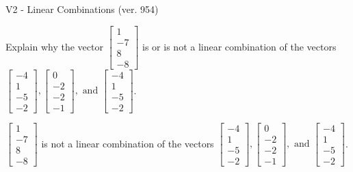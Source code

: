\begin{exercise}
  \begin{exerciseTitle}V2 - Linear Combinations (ver. 954)\end{exerciseTitle}
  \begin{exerciseStatement}
    Explain why the vector \(\left[\begin{array}{c}
1 \\
-7 \\
8 \\
-8
\end{array}\right]\)  is or is not a linear 
	combination of the vectors \(\left[\begin{array}{c}
-4 \\
1 \\
-5 \\
-2
\end{array}\right] , \left[\begin{array}{c}
0 \\
-2 \\
-2 \\
-1
\end{array}\right] , \text{ and } \left[\begin{array}{c}
-4 \\
1 \\
-5 \\
-2
\end{array}\right]\).
	


  \end{exerciseStatement}
  \begin{exerciseAnswer}
   \(\left[\begin{array}{c}
1 \\
-7 \\
8 \\
-8
\end{array}\right]\) 
  	 is not  
	a linear combination of the vectors \(\left[\begin{array}{c}
-4 \\
1 \\
-5 \\
-2
\end{array}\right] , \left[\begin{array}{c}
0 \\
-2 \\
-2 \\
-1
\end{array}\right] , \text{ and } \left[\begin{array}{c}
-4 \\
1 \\
-5 \\
-2
\end{array}\right]\).

	
  


  \end{exerciseAnswer}
\end{exercise}